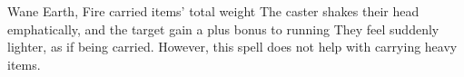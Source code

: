   {}%
  {Wane}%
  {Earth, Fire}%
  {carried items' total \gls{weight}}%
  {The caster shakes their head emphatically, and the target gain a plus  bonus to running}%
  {They feel suddenly lighter, as if being carried.
  However, this spell does not help with carrying heavy items.}
